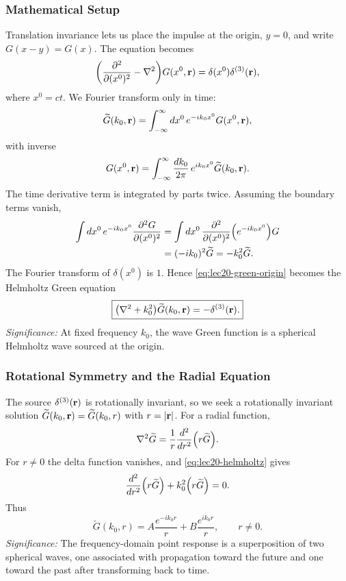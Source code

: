 \subsubsection*{Mathematical Setup}
Translation invariance lets us place the impulse at the origin, $y=0$, and write
$G(x-y)=G(x)$. The equation becomes
\begin{equation}\label{eq:lec20-green-origin}
  \qty(\frac{\partial^2}{\partial (x^0)^2}-\nabla^2)G(x^0,\mathbf{r})=\delta(x^0)\delta^{(3)}(\mathbf{r}),
\end{equation}
where $x^0=ct$. We Fourier transform only in time:
\begin{equation}\label{eq:lec20-fourier-def}
  \widetilde G(k_0,\mathbf{r})=\int_{-\infty}^{\infty}dx^0\,e^{-ik_0x^0}G(x^0,\mathbf{r}),
\end{equation}
with inverse
\begin{equation}\label{eq:lec20-fourier-inverse}
  G(x^0,\mathbf{r})=\int_{-\infty}^{\infty}\frac{dk_0}{2\pi}\,e^{ik_0x^0}\widetilde G(k_0,\mathbf{r}).
\end{equation}
The time derivative term is integrated by parts twice. Assuming the boundary terms vanish,
\begin{align*}
  \int dx^0\,e^{-ik_0x^0}\frac{\partial^2G}{\partial (x^0)^2}
  &=\int dx^0\,\frac{\partial^2}{\partial (x^0)^2}\qty(e^{-ik_0x^0})G \\
  &=(-ik_0)^2\widetilde G=-k_0^2\widetilde G.
\end{align*}
The Fourier transform of $\delta(x^0)$ is $1$. Hence \eqref{eq:lec20-green-origin}
becomes the Helmholtz Green equation
\begin{equation}\label{eq:lec20-helmholtz}
  \boxed{\qty(\nabla^2+k_0^2)\widetilde G(k_0,\mathbf{r})=-\delta^{(3)}(\mathbf{r}).}
\end{equation}
\textit{Significance:} At fixed frequency $k_0$, the wave Green function is a spherical Helmholtz wave sourced at the origin.

\subsubsection*{Rotational Symmetry and the Radial Equation}
The source $\delta^{(3)}(\mathbf{r})$ is rotationally invariant, so we seek a rotationally
invariant solution $\widetilde G(k_0,\mathbf{r})=\widetilde G(k_0,r)$ with $r=|\mathbf{r}|$. For a radial
function,
\begin{equation}\label{eq:lec20-radial-laplacian}
  \nabla^2\widetilde G=\frac{1}{r}\frac{d^2}{dr^2}\qty(r\widetilde G).
\end{equation}
For $r\neq0$ the delta function vanishes, and \eqref{eq:lec20-helmholtz} gives
\begin{equation}\label{eq:lec20-radial-homogeneous}
  \frac{d^2}{dr^2}\qty(r\widetilde G)+k_0^2\qty(r\widetilde G)=0.
\end{equation}
Thus
\begin{equation}\label{eq:lec20-Gtilde-general}
  \boxed{\widetilde G(k_0,r)=A\frac{e^{-ik_0r}}{r}+B\frac{e^{ik_0r}}{r},\qquad r\neq0.}
\end{equation}
\textit{Significance:} The frequency-domain point response is a superposition of two spherical waves, one associated with propagation toward the future and one toward the past after transforming back to time.

